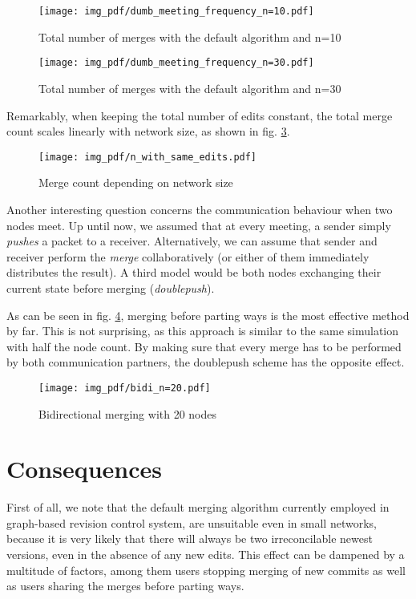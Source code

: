 \documentclass[letterpaper,conference]{IEEEtran}
\begin{document}
\begin{figure}
  \texttt{[image: img\_pdf/dumb\_meeting\_frequency\_n=10.pdf]}
  \caption{Total number of merges with the default algorithm and n=10}
  \label{fig:freq_dumb_n10}
\end{figure}
\begin{figure}
  \texttt{[image: img\_pdf/dumb\_meeting\_frequency\_n=30.pdf]}
  \caption{Total number of merges with the default algorithm and n=30}
  \label{fig:freq_dumb_n30}
\end{figure}

Remarkably, when keeping the total number of edits constant, the total merge count scales linearly with network size, as shown in fig. \ref{fig:n}.

\begin{figure}
  \texttt{[image: img\_pdf/n\_with\_same\_edits.pdf]}
  \caption{Merge count depending on network size}
  \label{fig:n}
\end{figure}



Another interesting question concerns the communication behaviour when two nodes meet. Up until now, we assumed that at every meeting, a sender simply \textit{pushes} a packet to a receiver. Alternatively, we can assume that sender and receiver perform the \textit{merge} collaboratively (or either of them immediately distributes the result). A third model would be both nodes exchanging their current state before merging (\textit{doublepush}).

As can be seen in fig. \ref{fig:bidi_n20}, merging before parting ways is the most effective method by far. This is not surprising, as this approach is similar to the same simulation with half the node count. By making sure that every merge has to be performed by both communication partners, the doublepush scheme has the opposite effect.

\begin{figure}
  \texttt{[image: img\_pdf/bidi\_n=20.pdf]}
  \caption{Bidirectional merging with 20 nodes}
  \label{fig:bidi_n20}
\end{figure}

\section{Consequences}

First of all, we note that the default merging algorithm currently employed in graph-based revision control system, are unsuitable even in small networks, because it is very likely that there will always be two irreconcilable newest versions, even in the absence of any new edits. This effect can be dampened by a multitude of factors, among them users stopping merging of new commits as well as users sharing the merges before parting ways.
\end{document}
